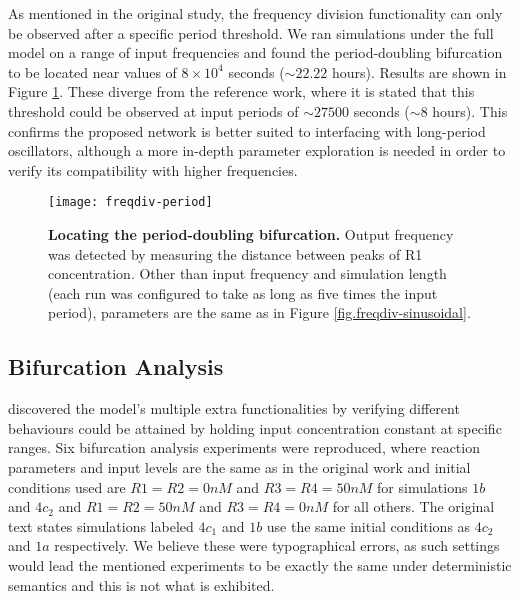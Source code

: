     As mentioned in the original study, the frequency division functionality can only be observed after a specific period threshold.
    We ran simulations under the full model on a range of input frequencies and found the period-doubling bifurcation to be located near values of $8 \times 10^4$ seconds ($\sim 22.22$ hours).
    Results are shown in Figure \ref{fig.freqdiv-period}.
    These diverge from the reference work, where it is stated that this threshold could be observed at input periods of $\sim 27500$ seconds ($\sim 8$ hours). %
    This confirms the proposed network is better suited to interfacing with long-period oscillators, although a more in-depth parameter exploration is needed in order to verify its compatibility with higher frequencies.

    \begin{figure}[!htb]
      \centering
      \texttt{[image: freqdiv-period]}
      \caption{\textbf{Locating the period-doubling bifurcation.} Output frequency was detected by measuring the distance between peaks of R1 concentration. Other than input frequency and simulation length (each run was configured to take as long as five times the input period), parameters are the same as in Figure \ref{fig.freqdiv-sinusoidal}.}
      \label{fig.freqdiv-period}
    \end{figure}


  \subsection{Bifurcation Analysis}

    \citet{originals} discovered the model's multiple extra functionalities by verifying different behaviours could be attained by holding input concentration constant at specific ranges.
    Six bifurcation analysis experiments were reproduced, where reaction parameters and input levels are the same as in the original work and initial conditions used are $R1=R2=0nM$ and $R3=R4=50nM$ for simulations $1b$ and $4c_{2}$ and $R1=R2=50nM$ and $R3=R4=0nM$ for all others.
    The original text states simulations labeled $4c_{1}$ and $1b$ use the same initial conditions as $4c_{2}$ and $1a$ respectively.
    We believe these were typographical errors, as such settings would lead the mentioned experiments to be exactly the same under deterministic semantics and this is not what is exhibited.

